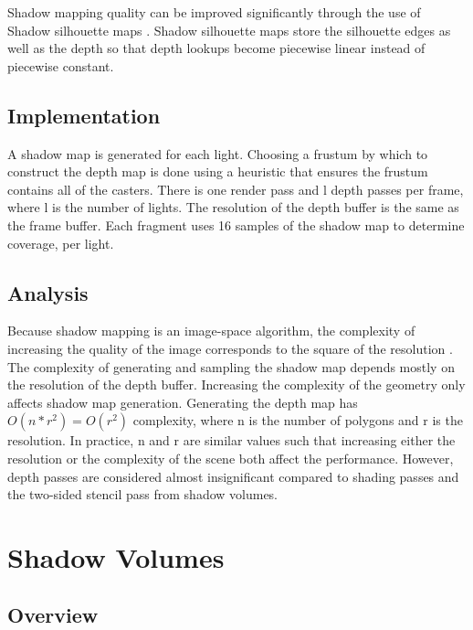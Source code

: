 \documentclass[12pt]{article}
\begin{document}
Shadow mapping quality can be improved significantly through the use of Shadow silhouette maps \cite{Sen:2003:SSM:882262.882301}. Shadow silhouette maps store the silhouette edges as well as the depth so that depth lookups become piecewise linear instead of piecewise constant.

\subsection{Implementation}

A shadow map is generated for each light. Choosing a frustum by which to construct the depth map is done using a heuristic that ensures the frustum contains all of the casters. There is one render pass and l depth passes per frame, where l is the number of lights. The resolution of the depth buffer is the same as the frame buffer. Each fragment uses 16 samples of the shadow map to determine coverage, per light.

\subsection{Analysis}

Because shadow mapping is an image-space algorithm, the complexity of increasing the quality of the image corresponds to the square of the resolution \cite{Williams:1978:CCS:800248.807402}.
The complexity of generating and sampling the shadow map depends mostly on the resolution of the depth buffer. Increasing the complexity of the geometry only affects shadow map generation.
Generating the depth map has \(O(n*r^{2}) = O(r^{2})\) complexity, where n is the number of polygons and r is the resolution.
In practice, n and r are similar values such that increasing either the resolution or the complexity of the scene both affect the performance. However, depth passes are considered almost insignificant compared to shading passes and the two-sided stencil pass from shadow volumes. 

\section{Shadow Volumes}

\subsection{Overview}
\end{document}
